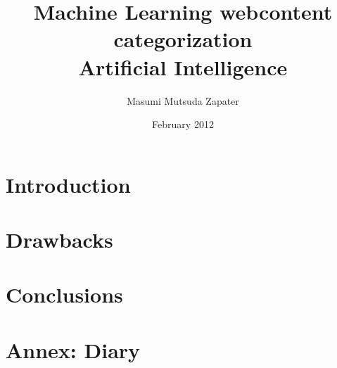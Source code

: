 \documentclass[a4paper , titlepage]{report}
\author{Masumi Mutsuda Zapater}
\title{Machine Learning webcontent categorization \\ Artificial Intelligence}
\date{February 2012}
\begin{document}
\maketitle



\tableofcontents


\chapter{Introduction}


\chapter{Drawbacks}


\chapter{Conclusions}
%



\chapter{Annex: Diary }

\end{document}

